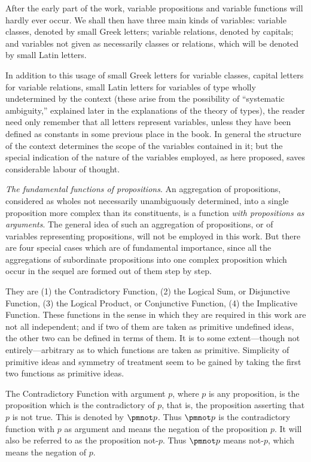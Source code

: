 \documentclass[letterpaper,12pt,openany,leqno]{book}
\newcommand{\pagefirst}[1]{\marginnote[\boxed{\text{#1}}]{\boxed{\text{#1}}}}
\begin{document}
After the early part of the work, variable propositions and variable functions will hardly ever occur. We shall then have three main kinds of variables: variable classes, denoted by small Greek letters; variable relations, denoted by capitals; and variables not given as necessarily classes or relations, which will be denoted by small Latin letters. 

In addition to this usage of small Greek letters for variable classes, capital letters for variable relations, small Latin letters for variables of type wholly undetermined by the context (these arise from the possibility of \pagefirst{6} ``systematic ambiguity,'' explained later in the explanations of the theory of types), the reader need only remember that all letters represent variables, unless they have been defined as constants in some previous place in the book. In general the structure of the context determines the scope of the variables contained in it; but the special indication of the nature of the variables employed, as here proposed, saves considerable labour of thought.

\textit{The fundamental functions of propositions}. An aggregation of propositions, considered as wholes not necessarily unambiguously determined, into a single proposition more complex than its constituents, is a function \textit{with propositions as arguments}. The general idea of such an aggregation of propositions, or of variables representing propositions, will not be employed in this work. But there are four special cases which are of fundamental importance, since all the aggregations of subordinate propositions into one complex proposition which occur in the sequel are formed out of them step by step.

They are (1) the Contradictory Function, (2) the Logical Sum, or Disjunctive Function, (3) the Logical Product, or Conjunctive Function, (4) the Implicative Function. These functions in the sense in which they are required in this work are not all independent; and if two of them are taken as primitive undefined ideas, the other two can be defined in terms of them. It is to some extent---though not entirely---arbitrary as to which functions are taken as primitive. Simplicity of primitive ideas and symmetry of treatment seem to be gained by taking the first two functions as primitive ideas. 

The Contradictory Function with argument $p$, where $p$ is any proposition, is the proposition which is the contradictory of $p$, that is, the proposition asserting that $p$ is not true. This is denoted by $\pmnot p$. Thus $\pmnot p$ is the contradictory function with $p$ as argument and means the negation of the proposition $p$. It will also be referred to as the proposition not-$p$. Thus $\pmnot p$ means not-$p$, which means the negation of $p$. 
\end{document}

